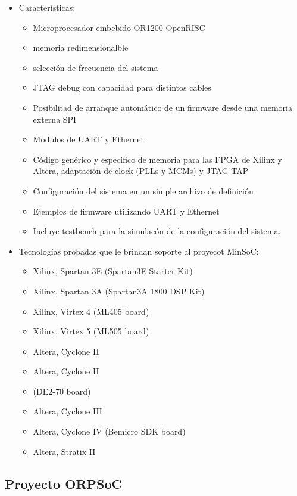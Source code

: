 \begin{itemize}
\item Características:
				\begin{itemize}
				  \item Microprocesador embebido OR1200 OpenRISC 
				  \item memoria redimensionalble
				  \item selección de frecuencia del sistema
				  \item JTAG debug con capacidad para distintos cables
				  \item Posibilitad de arranque automático de un firmware desde una memoria externa SPI
				  \item Modulos de UART y Ethernet 
				  \item Código genérico y especifico de memoria para las FPGA de Xilinx y Altera, adaptación de clock (PLLs y MCMs) y JTAG TAP
				  \item Configuración del sistema en un simple archivo de definición 
				  \item Ejemplos de firmware utilizando UART y Ethernet  
				  \item Incluye testbench para la simulacón de la configuración del sistema. 						
				\end{itemize}

\item Tecnologías probadas que le brindan soporte al proyecot MinSoC:


\begin{itemize}
				  \item Xilinx, Spartan 3E (Spartan3E Starter Kit)
				  \item Xilinx, Spartan 3A (Spartan3A 1800 DSP Kit)
				  \item Xilinx, Virtex 4 (ML405 board)
				  \item Xilinx, Virtex 5 (ML505 board)
				  \item Altera, Cyclone II
				  \item Altera, Cyclone II
				  \item (DE2-70 board)
				  \item Altera, Cyclone III
				  \item Altera, Cyclone IV (Bemicro SDK board) 
				  \item Altera, Stratix II						
				\end{itemize}
\end{itemize}


				\subsection{Proyecto ORPSoC}


